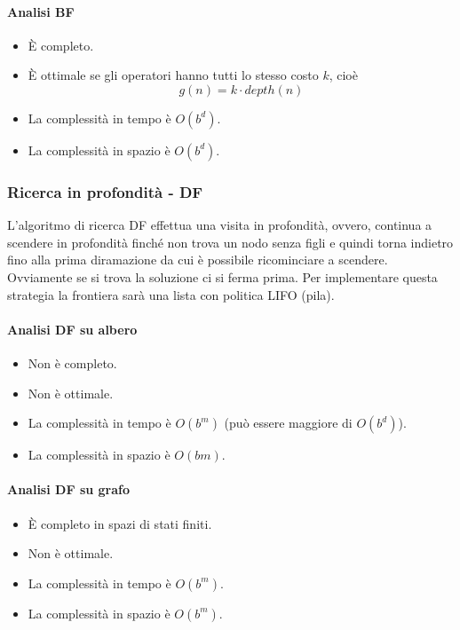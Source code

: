 \paragraph{Analisi BF}
\begin{itemize}
	\item \`E completo.
	\item \`E ottimale se gli operatori hanno tutti lo stesso costo $k$, cio\`e
	      \[ g(n) = k \cdot depth(n) \]
	\item La complessit\`a in tempo \`e $O(b^d)$.
	\item La complessit\`a in spazio \`e $O(b^d)$.
\end{itemize}

\subsubsection{Ricerca in profondit\`a - DF}
L'algoritmo di ricerca DF effettua una visita in profondit\`a, ovvero, continua a scendere
in profondit\`a finch\'e non trova un nodo senza figli e quindi torna indietro fino alla
prima diramazione da cui \`e possibile ricominciare a scendere. Ovviamente se si trova la
soluzione ci si ferma prima. Per implementare questa strategia la frontiera sar\`a una
lista con politica LIFO (pila).

\paragraph{Analisi DF su albero}
\begin{itemize}
	\item Non \`e completo.
	\item Non \`e ottimale.
	\item La complessit\`a in tempo \`e $O(b^m)$ (pu\`o essere maggiore di $O(b^d)$).
	\item La complessit\`a in spazio \`e $O(bm)$.
\end{itemize}
\paragraph{Analisi DF su grafo}
\begin{itemize}
	\item \`E completo in spazi di stati finiti.
	\item Non \`e ottimale.
	\item La complessit\`a in tempo \`e $O(b^m)$.
	\item La complessit\`a in spazio \`e $O(b^m)$.
\end{itemize}

